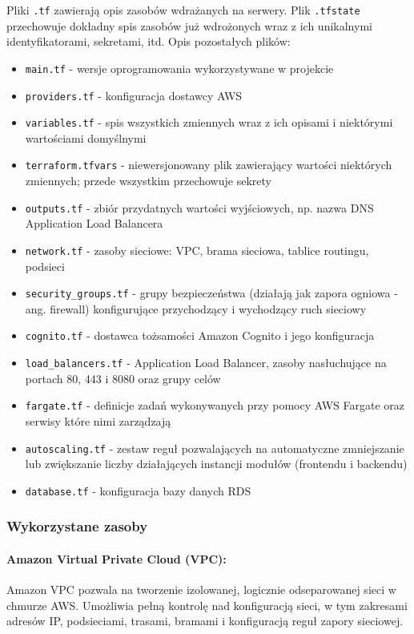 \documentclass[../../main.tex]{subfiles}
\begin{document}
        Pliki \texttt{.tf} zawierają opis zasobów wdrażanych na serwery. Plik \texttt{.tfstate} przechowuje dokładny spis zasobów już wdrożonych wraz z ich unikalnymi identyfikatorami, sekretami, itd. Opis pozostałych plików:
        \begin{itemize}
            \item \texttt{main.tf} - wersje oprogramowania wykorzystywane w projekcie
            \item \texttt{providers.tf} - konfiguracja dostawcy AWS
            \item \texttt{variables.tf} - spis wszystkich zmiennych wraz z ich opisami i niektórymi wartościami domyślnymi
            \item \texttt{terraform.tfvars} - niewersjonowany plik zawierający wartości niektórych zmiennych; przede wszystkim przechowuje sekrety
            \item \texttt{outputs.tf} - zbiór przydatnych wartości wyjściowych, np. nazwa DNS Application Load Balancera
            \item \texttt{network.tf} - zasoby sieciowe: VPC, brama sieciowa, tablice routingu, podsieci
            \item \texttt{security\_groups.tf} - grupy bezpieczeństwa (działają jak zapora ogniowa - ang. firewall) konfigurujące przychodzący i wychodzący ruch sieciowy
            \item \texttt{cognito.tf} - dostawca tożsamości Amazon Cognito i jego konfiguracja
            \item \texttt{load\_balancers.tf} - Application Load Balancer, zasoby nasłuchujące na portach 80, 443 i 8080 oraz grupy celów
            \item \texttt{fargate.tf} - definicje zadań wykonywanych przy pomocy AWS Fargate oraz serwisy które nimi zarządzają
            \item \texttt{autoscaling.tf} - zestaw reguł pozwalających na automatyczne zmniejszanie lub zwiększanie liczby działających instancji modułów (frontendu i backendu)
            \item \texttt{database.tf} - konfiguracja bazy danych RDS
        \end{itemize}
    \subsubsection{Wykorzystane zasoby}
        \paragraph{Amazon Virtual Private Cloud (VPC):}
        Amazon VPC pozwala na tworzenie izolowanej, logicznie odseparowanej sieci w chmurze AWS. Umożliwia pełną kontrolę nad konfiguracją sieci, w tym zakresami adresów IP, podsieciami, trasami, bramami i konfiguracją reguł zapory sieciowej.
        
\end{document}
